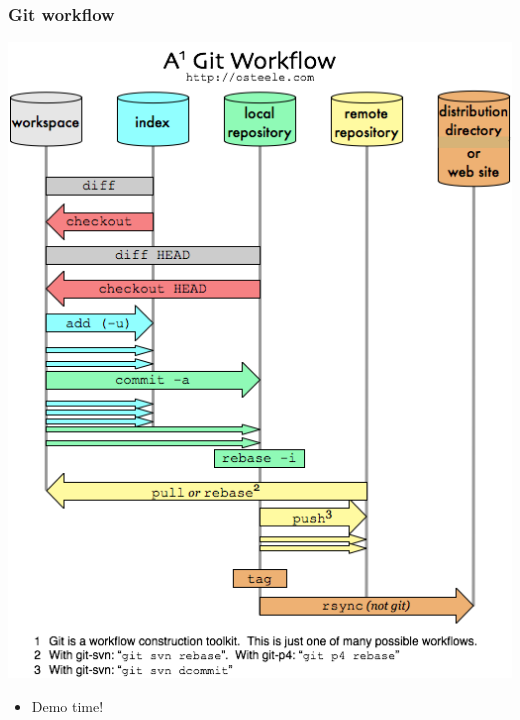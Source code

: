 \documentclass{beamer}
\begin{document}
\begin{frame}
    \frametitle{Git workflow}
    \includegraphics[scale = 0.3]{git-workflow.png}
\end{frame}

\begin{frame}
    \begin{itemize}
	\item Demo time!
    \end{itemize}
\end{frame}
\end{document}
